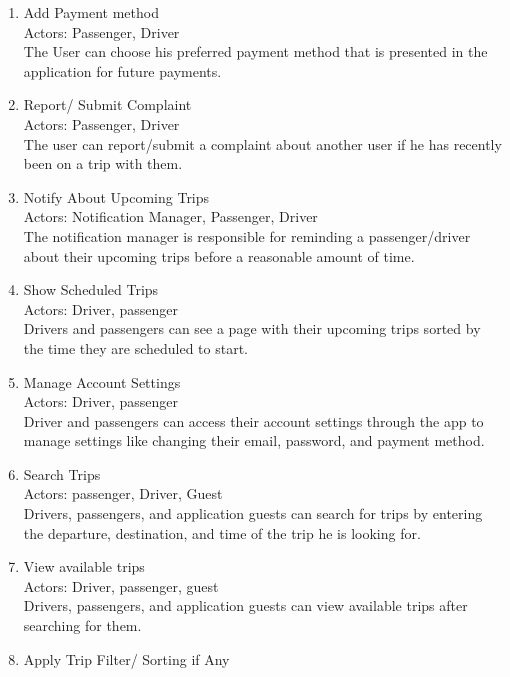 \documentclass[a4paper, 12pt]{article} %
\begin{document}
\begin{enumerate}
                \item Add Payment method \\
                    Actors: Passenger, Driver \\
                    The User can choose his preferred payment method that is presented in the application for future payments.
                \item Report/ Submit Complaint \\
                    Actors: Passenger, Driver \\
                    The user can report/submit a complaint about another user if he has recently been on a trip with them.
                \item Notify About Upcoming Trips \\
                    Actors: Notification Manager, Passenger, Driver \\
                    The notification manager is responsible for reminding a passenger/driver about their upcoming trips before a reasonable amount of time.
                \item Show Scheduled Trips \\
                    Actors: Driver, passenger \\
                    Drivers and passengers can see a page with their upcoming trips sorted by the time they are scheduled to start. 
                \item Manage Account Settings\\ 
                    Actors: Driver, passenger\\
                    Driver and passengers can access their account settings through the app to manage settings like changing their email, password, and payment method.
                \item Search Trips \\
                    Actors: passenger, Driver, Guest \\
                    Drivers, passengers, and application guests can search for trips by entering the departure, destination, and time of the trip he is looking for.
                \item View available trips \\
                    Actors: Driver, passenger, guest \\
                    Drivers, passengers, and application guests can view available trips after searching for them.
                \item Apply Trip Filter/ Sorting if Any \\

\end{enumerate}
\end{document}
